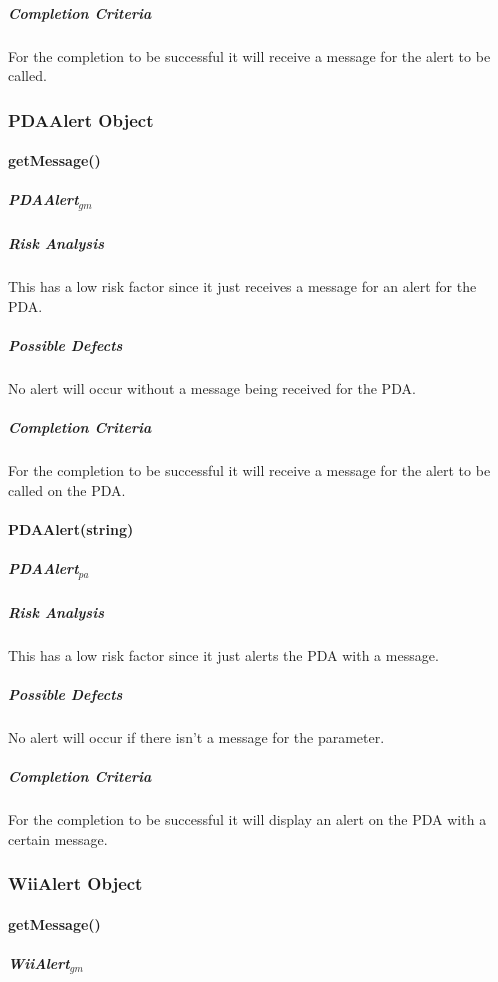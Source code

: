 \documentclass{article}
\begin{document}
\subparagraph{Completion Criteria}
For the completion to be successful it will receive a message for the alert to be called.


\subsubsection{PDAAlert Object}

\paragraph{getMessage()}

\subparagraph{PDAAlert$_{gm}$}

\subparagraph{Risk Analysis}
This has a low risk factor since it just receives a message for an alert for the PDA.

\subparagraph{Possible Defects}
No alert will occur without a message being received for the PDA.

\subparagraph{Completion Criteria}
For the completion to be successful it will receive a message for the alert to be called on the PDA.


\paragraph{PDAAlert(string)}

\subparagraph{PDAAlert$_{pa}$}

\subparagraph{Risk Analysis}
This has a low risk factor since it just alerts the PDA with a message.

\subparagraph{Possible Defects}
No alert will occur if there isn't a message for the parameter.

\subparagraph{Completion Criteria}
For the completion to be successful it will display an alert on the PDA with a certain message.


\subsubsection{WiiAlert Object}

\paragraph{getMessage()}

\subparagraph{WiiAlert$_{gm}$}
\end{document}
